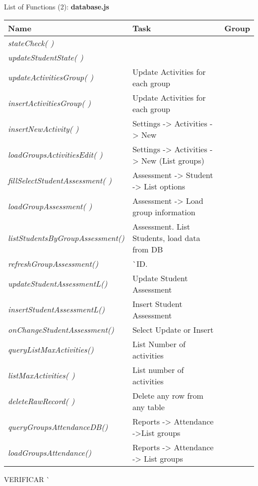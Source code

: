 \newpage


\begin{bclogo}[couleur=orange!30,logo=\bcbook, arrondi=0.1,ombre=true ] 
{List of Functions (2): {\bf database.js}}	
\begin{tabular}{lll}
Name                    & Task            & Group \\
\hline

\emph { stateCheck( )}                  &{ }\\
\emph { updateStudentState( )}          &{ } \\



\emph { updateActivitiesGroup( )}       &{ Update Activities for each group }\\
\emph { insertActivitiesGroup( )}       & { Update Activities for each group } \\
\emph { insertNewActivity(  ) }        & {Settings -> Activities -> New }\\
\emph { loadGroupsActivitiesEdit( )}    & {Settings -> Activities -> New (List groups) } \\
\emph { fillSelectStudentAssessment( )}  & { Assessment -> Student -> List options  }\\
\emph { loadGroupAssessment(  ) }       & { Assessment -> Load group information } \\
\emph { listStudentsByGroupAssessment()} & {  Assessment. List Students, load data  from DB } \\
\emph { refreshGroupAssessment()}       & { ^^ ID.} \\
\emph { updateStudentAssessmentL() }    & {  Update Student Assessment} \\
\emph { insertStudentAssessmentL() }    &{ Insert Student Assessment   }\\
\emph { onChangeStudentAssessment() }   & { Select Update or Insert  } \\
\emph { queryListMaxActivities() }      &{ List Number of activities } \\
\emph { listMaxActivities( ) }          &{ List number of activities } \\
\emph { deleteRawRecord( ) }            & { Delete any row from any table } \\
\emph { queryGroupsAttendanceDB() }     & Reports -> Attendance ->List  groups \\
\emph { loadGroupsAttendance()}         &{ Reports -> Attendance -> List  groups  } \\

\end{tabular}
\end{bclogo}  
{\huge  VERIFICAR ^^ }

